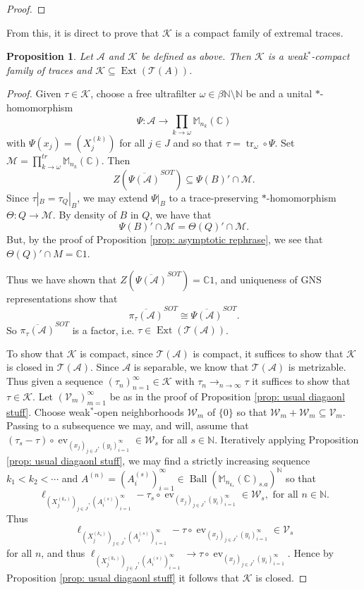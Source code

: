 \documentclass[10pt]{amsart}
\newtheorem{prop}[thm]{Proposition}
\theoremstyle{definition}
\numberwithin{equation}{section}
\newcommand{\bC}{{\mathbb C}}
\newcommand{\bM}{{\mathbb M}}
\newcommand{\bN}{{\mathbb N}}
\newcommand{\cA}{{\mathcal A}}
\newcommand{\cK}{{\mathcal K}}
\newcommand{\cM}{{\mathcal M}}
\newcommand{\cT}{{\mathcal T}}
\newcommand{\cV}{{\mathcal V}}
\newcommand{\cW}{{\mathcal W}}
\DeclareMathOperator{\tr}{tr}
\DeclareMathOperator{\ev}{ev}
\DeclareMathOperator{\Ball}{Ball}
\DeclareMathOperator{\Ext}{Ext}
\begin{document}
\begin{proof}
\end{proof}

From this, it is direct to prove that $\cK$ is a compact family of extremal traces. 

\begin{prop}\label{prop: get that Bauer simplex}
Let $\cA$ and $\cK$ be defined as above. Then $\cK$ is a weak$^{*}$-compact family of traces and $\cK\subseteq \Ext(\cT(A))$.    
\end{prop}

\begin{proof}
Given $\tau\in \cK$, choose a free ultrafilter    $\omega\in \beta\bN\setminus \bN$ be and a unital $*$-homomorphism
\[\Psi\colon \cA\to \prod_{k\to\omega}\bM_{n_{k}}(\bC)\]
with $\Psi(x_{j})=(X^{(k)}_{j})$ for all $j\in J$ and so that $\tau=\tr_{\omega}\circ \Psi$. Set $\cM=\prod_{k\to\omega}^{tr}\bM_{n_{k}}(\bC).$ Then 
\[Z(\overline{\Psi(\cA)}^{SOT})\subseteq \Psi(B)'\cap \cM.\]
Since $\tau|_{B}=\tau_{Q}|_{B}$, we may extend $\Psi|_{B}$ to a trace-preserving $*$-homomorphism $\Theta\colon Q\to \cM$. By density of $B$ in $Q$, we have that 
\[\Psi(B)'\cap \cM=\Theta(Q)'\cap \cM.\]
But, by the proof of Proposition \ref{prop: asymptotic rephrase}, we see that $\Theta(Q)'\cap M=\bC1$.


Thus we have shown that $Z(\overline{\Psi(\cA)}^{SOT})=\bC1$, and uniqueness of GNS representations show that
\[\overline{\pi_{\tau}(\cA)}^{SOT}\cong \overline{\Psi(\cA)}^{SOT}.\]
So $\overline{\pi_{\tau}(\cA)}^{SOT}$ is a factor, i.e. $\tau\in \Ext(\cT(\cA))$. 

To show that $\cK$ is compact, since $\cT(\cA)$ is compact, it suffices to show that $\cK$ is closed in $\cT(\cA)$. Since $\cA$ is separable, we know that $\cT(\cA)$ is metrizable. Thus given a sequence $(\tau_{n})_{n=1}^{\infty}\in \cK$ with $\tau_{n}\to_{n\to\infty}\tau$ it suffices to show that $\tau\in \cK$. Let $(\cV_{m})_{m=1}^{\infty}$ be as in the proof of Proposition \ref{prop: usual diagaonl stuff}. Choose weak$^{*}$-open neighborhoods $\cW_{m}$ of $\{0\}$ so that $\cW_{m}+\cW_{m}\subseteq \cV_{m}$.  Passing to a subsequence we may, and will, assume that $(\tau_{s}-\tau)\circ \ev_{(x_{j})_{j\in J},(y_{i})_{i=1}^{\infty}}\in \cW_{s}$ for all $s\in \bN$. Iteratively applying Proposition \ref{prop: usual diagaonl stuff}, we may find a strictly increasing sequence $k_{1}<k_{2}<\cdots$ and $A^{(n)}=(A_{i}^{(s)})_{i=1}^{\infty}\in \Ball(\bM_{n_{k_{s}}}(\bC)_{s.a})^{\bN}$ so that \[\ell_{(X^{(k_{s})}_{j})_{j\in J},(A^{(s)}_{i})_{i=1}^{\infty}}-\tau_{s}\circ \ev_{(x_{j})_{j\in J},(y_{i})_{i=1}^{\infty}}\in  \cW_{s}, \text{ for all $n\in \bN$.}\]
Thus
\[\ell_{(X^{(k_{s})}_{j})_{j\in J},(A_{i}^{(s)})_{i=1}^{\infty}}-\tau\circ \ev_{(x_{j})_{j\in J},(y_{i})_{i=1}^{\infty}}\in \mathcal{V}_{s}\]
for all $n$, and thus $\ell_{(X^{(k_{s})}_{j})_{j\in J},(A^{(s)}_{i})_{i=1}^{\infty}}\to\tau\circ \ev_{(x_{j})_{j\in J},(y_{i})_{i=1}^{\infty}}.$ 
Hence by Proposition \ref{prop: usual diagaonl stuff} it follows that $\cK$ is closed. 



\end{proof}
\end{document}
